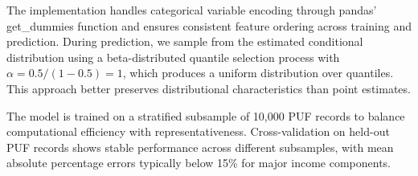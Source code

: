 The implementation handles categorical variable encoding through pandas' get\_dummies function and ensures consistent feature ordering across training and prediction. During prediction, we sample from the estimated conditional distribution using a beta-distributed quantile selection process with $\alpha = 0.5/(1-0.5) = 1$, which produces a uniform distribution over quantiles. This approach better preserves distributional characteristics than point estimates.

The model is trained on a stratified subsample of 10,000 PUF records to balance computational efficiency with representativeness. Cross-validation on held-out PUF records shows stable performance across different subsamples, with mean absolute percentage errors typically below 15\% for major income components.